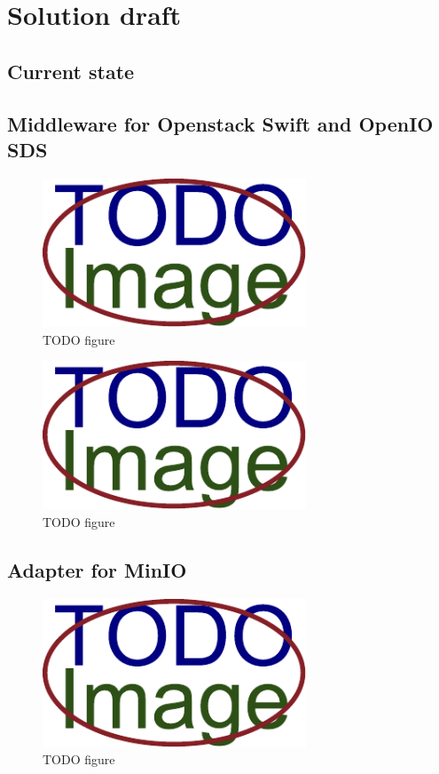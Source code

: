 \chapter{Solution draft}
    \textcolor{gray}{\Blindtext}
\section{Current state}
    \textcolor{gray}{\Blindtext}
\section{Middleware for Openstack Swift and OpenIO SDS}
    \textcolor{gray}{\Blindtext}
    \begin{figure}[hbt]
        \centering
        \includegraphics[width=0.7\textwidth]{obrazky-figures/placeholder.pdf}
        \caption{TODO figure}
    \end{figure}
    \textcolor{gray}{\Blindtext}
    \begin{figure}[hbt]
        \centering
        \includegraphics[width=0.7\textwidth]{obrazky-figures/placeholder.pdf}
        \caption{TODO figure}
    \end{figure}
\section{Adapter for MinIO}
    \textcolor{gray}{\Blindtext}
    \begin{figure}[hbt]
        \centering
        \includegraphics[width=0.7\textwidth]{obrazky-figures/placeholder.pdf}
        \caption{TODO figure}
    \end{figure}

